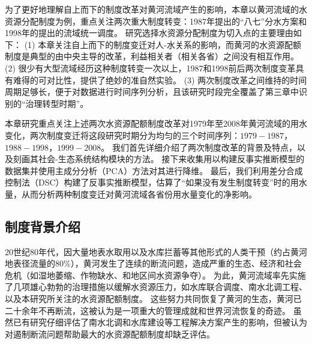 

为了更好地理解自上而下的制度改革对黄河流域产生的影响，本章以黄河流域的水资源分配制度为例，重点关注两次重大制度转变：1987年提出的“八七”分水方案和1998年的提出的流域统一调度。
研究选择水资源分配制度为切入点的主要理由如下：
(1) 本章关注自上而下的制度变迁对人-水关系的影响，而黄河的水资源配额制度是典型的由中央主导的改革，利益相关者（相关各省）之间没有相互作用。
(2) 很少有大型流域经历这种制度转变一次以上，1987和1998前后两次制度变革具有难得的可对比性，提供了绝妙的准自然实验。
(3) 两次制度改革之间维持的时间周期足够长，便于对数据进行时间序列分析，且该研究时段完全覆盖了第三章中识别的“治理转型时期”。

本章研究重点关注上述两次水资源配额制度改革对1979年至2008年黄河流域的用水变化，两次制度变迁将这段研究时期分为均匀的三个时间序列：$1979-1987$，$1988-1998$，$1999-2008$。
我们首先详细介绍了两次制度改革的背景及特点，以及刻画其社会-生态系统结构模块的方法。
接下来收集用以构建反事实推断模型的数据集并使用主成分分析（PCA）方法对其进行降维。
最后，我们利用差分合成控制法（DSC）构建了反事实推断模型\cite{arkhangelsky2021}，估算了“如果没有发生制度转变”时的用水量，从而分析两种制度变迁对黄河流域各省份用水量变化的净影响。

\subsection{制度背景介绍}\label{sec:yrb}

20世纪80年代，因大量地表水取用以及水库拦蓄等其他形式的人类干预（约占黄河地表径流量的$80\%$），黄河发生了连续的断流问题，造成严重的生态、经济和社会危机（如湿地萎缩、作物缺水、和地区间水资源争夺）。
为此，黄河流域率先实施了几项雄心勃勃的治理措施以缓解水资源压力，如水库联合调度、南水北调工程、以及本研究所关注的水资源配额制度\cite{long2020, wang2019d}。
这些努力共同恢复了黄河的生态，黄河已二十余年不再断流，这被认为是一项重大的管理成就和世界河流恢复的奇迹。
虽然已有研究仔细评估了南水北调和水库建设等工程解决方案产生的影响\cite{long2020,wang2019c}，但被认为对遏制断流问题帮助最大的水资源配额制度却缺乏评估\cite{wang2019b}。

